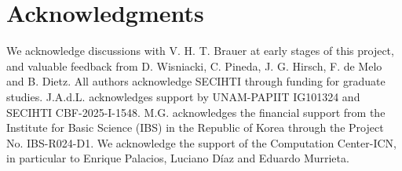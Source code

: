 \documentclass[pra,twocolumn,aps,showpacs,superscriptaddress,longbibliography]{revtex4-2}%
\providecommand{\DIFaddbegin}{} %
\providecommand{\DIFaddend}{} %
\begin{document}
\section*{Acknowledgments}
We acknowledge discussions with V. H. T. Brauer at early stages of this project, and valuable feedback from D. Wisniacki, C. Pineda, J. G. Hirsch, F. de Melo and B. Dietz.
All authors acknowledge SECIHTI through funding for graduate studies.
J.A.d.L. acknowledges support by UNAM-PAPIIT IG101324 and SECIHTI CBF-2025-I-1548. M.G. acknowledges the financial support from the Institute for Basic Science (IBS) in the Republic of Korea through the Project No. IBS-R024-D1. We acknowledge the support of the Computation Center-ICN, in particular to Enrique Palacios, Luciano Díaz and Eduardo Murrieta.
\DIFaddbegin 


\DIFaddend %

%

\appendix
% 

\end{document}
